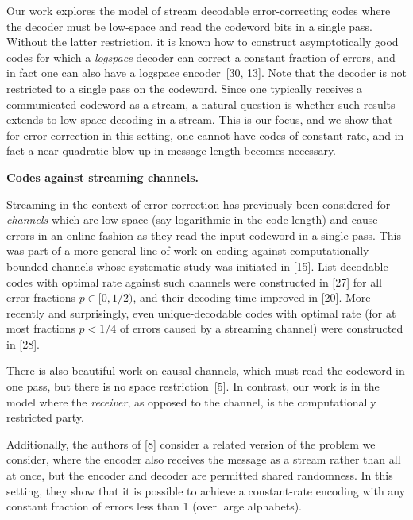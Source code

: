 \documentclass[10pt,a4paper]{article}
\begin{document}
Our work explores the model of stream decodable error-correcting codes where the decoder must be low-space and read the codeword bits in a single pass. Without the latter restriction, it is known how to construct asymptotically good codes for which a \emph{logspace} decoder can correct a constant fraction of errors, and in fact one can also have a logspace encoder [30, 13]. Note that the decoder is not restricted to a single pass on the codeword. Since one typically receives a communicated codeword as a stream, a natural question is whether such results extends to low space decoding in a stream.
This is our focus, and we show that for error-correction in this setting, one cannot have codes of constant rate, and in fact a near quadratic blow-up in message length becomes necessary.\par





\par\medskip\noindent\textbf{Codes against streaming channels.}\par




Streaming in the context of error-correction has previously been considered for \emph{channels} which are low-space (say logarithmic in the code length) and cause errors in an online fashion as they read the input codeword in a single pass. This was part of a more general line of work on coding against computationally bounded channels whose systematic study was initiated in [15]. List-decodable codes with optimal rate against such channels were constructed in [27] for all error fractions $p\in[0,1/2)$, and their decoding time improved in [20]. More recently and surprisingly, even unique-decodable codes with optimal rate (for at most fractions $p<1/4$ of errors caused by a streaming channel) were constructed in [28].\par




There is also beautiful work on causal channels, which must read the codeword in one pass, but there is no space restriction [5]. In contrast, our work is in the model where the \emph{receiver}, as opposed to the channel, is the computationally restricted party.\par




Additionally, the authors of [8] consider a related version of the problem we consider, where the encoder also receives the message as a stream rather than all at once, but the encoder and decoder are permitted shared randomness. In this setting, they show that it is possible to achieve a constant-rate encoding with any constant fraction of errors less than 1 (over large alphabets).\par
\end{document}
